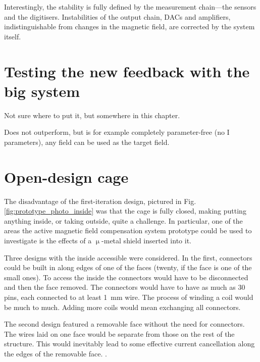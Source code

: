 Interestingly, the stability is fully defined by the measurement chain---the sensors and the digitisers. Instabilities of the output chain, DACs and amplifiers, indistinguishable from changes in the magnetic field, are corrected by the system itself.




\section{Testing the new feedback with the big system}
Not sure where to put it, but somewhere in this chapter.

Does not outperform, but is for example completely parameter-free (no I parameters), any field can be used as the target field.


\section{Open-design cage}
The disadvantage of the first-iteration design, pictured in Fig.\,\ref{fig:prototype_photo_inside} was that the cage is fully closed, making putting anything inside, or taking outside, quite a challenge. In particular, one of the areas the active magnetic field compensation system prototype could be used to investigate is the effects of a $\upmu$-metal shield inserted into it.

Three designs with the inside accessible were considered. In the first, connectors could be built in along edges of one of the faces (twenty, if the face is one of the small ones). To access the inside the connectors would have to be disconnected and then the face removed. The connectors would have to have as much as 30 pins, each connected to at least \SI{1}{\milli\meter} wire. 
 The process of winding a coil would be much to much.
Adding more coils would mean exchanging all connectors.

The second design featured a removable face without the need for connectors. The wires laid on one face would be separate from those on the rest of the structure. This would inevitably lead to some effective current cancellation along the edges of the removable face. .

